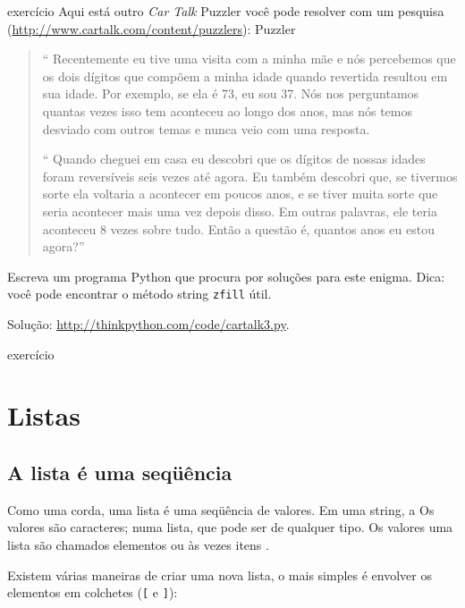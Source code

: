 \documentclass[10pt]{book}
\begin{document}
\begin{} exercício
Aqui está outro {\em Car Talk} Puzzler você pode resolver com um
pesquisa (\url{http://www.cartalk.com/content/puzzlers}):
\index{} Puzzler

\begin{quote}
`` Recentemente eu tive uma visita com a minha mãe e nós percebemos que
os dois dígitos que compõem a minha idade quando revertida resultou em sua
idade. Por exemplo, se ela é 73, eu sou 37. Nós nos perguntamos quantas vezes isso tem
aconteceu ao longo dos anos, mas nós temos desviado com outros temas e
nunca veio com uma resposta.

`` Quando cheguei em casa eu descobri que os dígitos de nossas idades foram
reversíveis seis vezes até agora. Eu também descobri que, se tivermos sorte ela
voltaria a acontecer em poucos anos, e se tiver muita sorte que seria
acontecer mais uma vez depois disso. Em outras palavras, ele teria
aconteceu 8 vezes sobre tudo. Então a questão é, quantos anos eu estou agora?''

\end{quote}

Escreva um programa Python que procura por soluções para este enigma.
Dica: você pode encontrar o método string {\tt zfill} útil.

Solução: \url{http://thinkpython.com/code/cartalk3.py}.

\end{} exercício



\chapter{Listas}

\section{A lista é uma seqüência}
\label{seqüência}

Como uma corda, uma lista {\bf} é uma seqüência de valores. Em uma string, a
Os valores são caracteres; numa lista, que pode ser de qualquer tipo. Os valores
uma lista são chamados elementos {\bf} ou às vezes {itens \bf}.

Existem várias maneiras de criar uma nova lista, o mais simples é
envolver os elementos em colchetes (\verb "[" e \verb "]"):
\end{document}
